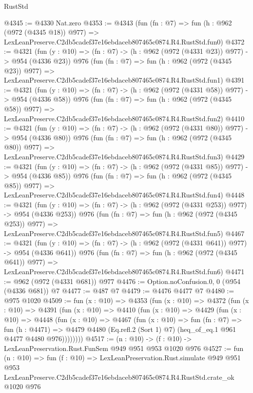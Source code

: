 \begin{lexlean}{RustStd}
\begin{coremodule}
@4345 := @4330 Nat.zero
@4353 := @4343
    (fun (fn : @7) =>
    fun (h : @962 (@972 (@4345 @18)) @977) =>
    LexLeanPreserve.C2db5cadef37e16ebdaceb807465c0874.R4.RustStd.fun0)
@4372 := @4321
    (fun (y : @10) => (fn : @7) -> (h : @962 (@972 (@4331 @23)) @977) -> @954 (@4336 @23))
    @976
    (fun (fn : @7) =>
    fun (h : @962 (@972 (@4345 @23)) @977) =>
    LexLeanPreserve.C2db5cadef37e16ebdaceb807465c0874.R4.RustStd.fun1)
@4391 := @4321
    (fun (y : @10) => (fn : @7) -> (h : @962 (@972 (@4331 @58)) @977) -> @954 (@4336 @58))
    @976
    (fun (fn : @7) =>
    fun (h : @962 (@972 (@4345 @58)) @977) =>
    LexLeanPreserve.C2db5cadef37e16ebdaceb807465c0874.R4.RustStd.fun2)
@4410 := @4321
    (fun (y : @10) => (fn : @7) -> (h : @962 (@972 (@4331 @80)) @977) -> @954 (@4336 @80))
    @976
    (fun (fn : @7) =>
    fun (h : @962 (@972 (@4345 @80)) @977) =>
    LexLeanPreserve.C2db5cadef37e16ebdaceb807465c0874.R4.RustStd.fun3)
@4429 := @4321
    (fun (y : @10) => (fn : @7) -> (h : @962 (@972 (@4331 @85)) @977) -> @954 (@4336 @85))
    @976
    (fun (fn : @7) =>
    fun (h : @962 (@972 (@4345 @85)) @977) =>
    LexLeanPreserve.C2db5cadef37e16ebdaceb807465c0874.R4.RustStd.fun4)
@4448 := @4321
    (fun (y : @10) => (fn : @7) -> (h : @962 (@972 (@4331 @253)) @977) -> @954 (@4336 @253))
    @976
    (fun (fn : @7) =>
    fun (h : @962 (@972 (@4345 @253)) @977) =>
    LexLeanPreserve.C2db5cadef37e16ebdaceb807465c0874.R4.RustStd.fun5)
@4467 := @4321
    (fun (y : @10) => (fn : @7) -> (h : @962 (@972 (@4331 @641)) @977) -> @954 (@4336 @641))
    @976
    (fun (fn : @7) =>
    fun (h : @962 (@972 (@4345 @641)) @977) =>
    LexLeanPreserve.C2db5cadef37e16ebdaceb807465c0874.R4.RustStd.fun6)
@4471 := @962 (@972 (@4331 @681)) @977
@4476 := Option.noConfusion.{0, 0} (@954 (@4336 @681)) @7
@4477 := @487 @7
@4479 := @4476 @4477 @7
@4480 := @975 @1020
@4509 := fun (x : @10) =>
  @4353
    (fun (x : @10) =>
    @4372
      (fun (x : @10) =>
      @4391
        (fun (x : @10) =>
        @4410
          (fun (x : @10) =>
          @4429
            (fun (x : @10) =>
            @4448
              (fun (x : @10) =>
              @4467
                (fun (x : @10) =>
                fun (fn : @7) =>
                fun (h : @4471) =>
                @4479 @4480 (Eq.refl.{2} (Sort 1) @7) (heq_of_eq.{1} @961 @4477 @4480 @976))))))))
@4517 := (n : @10) -> (f : @10) -> LexLeanPreservation.Rust.FunSem @949 @951 @953 @1020 @976
@4527 := fun (n : @10) =>
  fun (f : @10) =>
  LexLeanPreservation.Rust.simulate
    @949
    @951
    @953
    LexLeanPreserve.C2db5cadef37e16ebdaceb807465c0874.R4.RustStd.crate_ok
    @1020
    @976
\end{coremodule}
\end{lexlean}
